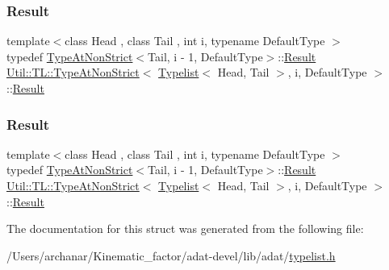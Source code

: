 \subsubsection{\texorpdfstring{Result}{Result}\hspace{0.1cm}{\footnotesize\ttfamily [2/3]}}
{\footnotesize\ttfamily template$<$class Head , class Tail , int i, typename Default\+Type $>$ \\
typedef \mbox{\hyperlink{structUtil_1_1TL_1_1TypeAtNonStrict}{Type\+At\+Non\+Strict}}$<$Tail, i -\/ 1, Default\+Type$>$\+::\mbox{\hyperlink{structUtil_1_1TL_1_1TypeAtNonStrict_3_01Typelist_3_01Head_00_01Tail_01_4_00_01i_00_01DefaultType_01_4_a8373e5740e40b58eb026277b65fdd1de}{Result}} \mbox{\hyperlink{structUtil_1_1TL_1_1TypeAtNonStrict}{Util\+::\+T\+L\+::\+Type\+At\+Non\+Strict}}$<$ \mbox{\hyperlink{structUtil_1_1Typelist}{Typelist}}$<$ Head, Tail $>$, i, Default\+Type $>$\+::\mbox{\hyperlink{structUtil_1_1TL_1_1TypeAtNonStrict_3_01Typelist_3_01Head_00_01Tail_01_4_00_01i_00_01DefaultType_01_4_a8373e5740e40b58eb026277b65fdd1de}{Result}}}

\mbox{\label{structUtil_1_1TL_1_1TypeAtNonStrict_3_01Typelist_3_01Head_00_01Tail_01_4_00_01i_00_01DefaultType_01_4_a8373e5740e40b58eb026277b65fdd1de}} 
\subsubsection{\texorpdfstring{Result}{Result}\hspace{0.1cm}{\footnotesize\ttfamily [3/3]}}
{\footnotesize\ttfamily template$<$class Head , class Tail , int i, typename Default\+Type $>$ \\
typedef \mbox{\hyperlink{structUtil_1_1TL_1_1TypeAtNonStrict}{Type\+At\+Non\+Strict}}$<$Tail, i -\/ 1, Default\+Type$>$\+::\mbox{\hyperlink{structUtil_1_1TL_1_1TypeAtNonStrict_3_01Typelist_3_01Head_00_01Tail_01_4_00_01i_00_01DefaultType_01_4_a8373e5740e40b58eb026277b65fdd1de}{Result}} \mbox{\hyperlink{structUtil_1_1TL_1_1TypeAtNonStrict}{Util\+::\+T\+L\+::\+Type\+At\+Non\+Strict}}$<$ \mbox{\hyperlink{structUtil_1_1Typelist}{Typelist}}$<$ Head, Tail $>$, i, Default\+Type $>$\+::\mbox{\hyperlink{structUtil_1_1TL_1_1TypeAtNonStrict_3_01Typelist_3_01Head_00_01Tail_01_4_00_01i_00_01DefaultType_01_4_a8373e5740e40b58eb026277b65fdd1de}{Result}}}



The documentation for this struct was generated from the following file\+:\begin{DoxyCompactItemize}
\item 
/\+Users/archanar/\+Kinematic\+\_\+factor/adat-\/devel/lib/adat/\mbox{\hyperlink{adat-devel_2lib_2adat_2typelist_8h}{typelist.\+h}}\end{DoxyCompactItemize}
